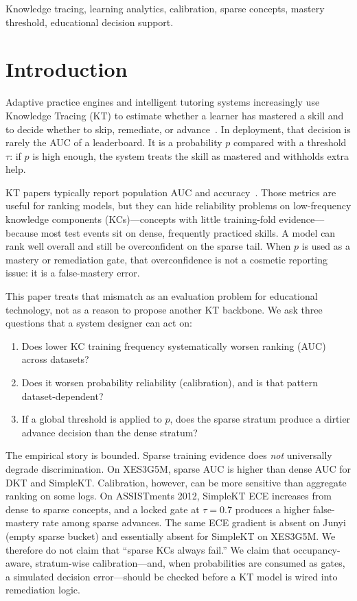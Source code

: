\documentclass[journal,10pt,twocolumn]{IEEEtran}
\begin{document}
\begin{IEEEkeywords}
Knowledge tracing, learning analytics, calibration, sparse concepts, mastery threshold, educational decision support.
\end{IEEEkeywords}

\section{Introduction}

Adaptive practice engines and intelligent tutoring systems increasingly use Knowledge Tracing (KT) to estimate whether a learner has mastered a skill and to decide whether to skip, remediate, or advance~\cite{corbett1994knowledge,piech2015deep,abdelrahman2023knowledge}. In deployment, that decision is rarely the AUC of a leaderboard. It is a probability $p$ compared with a threshold $\tau$: if $p$ is high enough, the system treats the skill as mastered and withholds extra help.

KT papers typically report population AUC and accuracy~\cite{liu2023simplekt,liu2022pykt}. Those metrics are useful for ranking models, but they can hide reliability problems on low-frequency knowledge components (KCs)---concepts with little training-fold evidence---because most test events sit on dense, frequently practiced skills. A model can rank well overall and still be overconfident on the sparse tail. When $p$ is used as a mastery or remediation gate, that overconfidence is not a cosmetic reporting issue: it is a false-mastery error.

This paper treats that mismatch as an evaluation problem for educational technology, not as a reason to propose another KT backbone. We ask three questions that a system designer can act on:

\begin{enumerate}
\item Does lower KC training frequency systematically worsen ranking (AUC) across datasets?
\item Does it worsen probability reliability (calibration), and is that pattern dataset-dependent?
\item If a global threshold is applied to $p$, does the sparse stratum produce a dirtier advance decision than the dense stratum?
\end{enumerate}

The empirical story is bounded. Sparse training evidence does \emph{not} universally degrade discrimination. On XES3G5M, sparse AUC is higher than dense AUC for DKT and SimpleKT. Calibration, however, can be more sensitive than aggregate ranking on some logs. On ASSISTments 2012, SimpleKT ECE increases from dense to sparse concepts, and a locked gate at $\tau=0.7$ produces a higher false-mastery rate among sparse advances. The same ECE gradient is absent on Junyi (empty sparse bucket) and essentially absent for SimpleKT on XES3G5M. We therefore do not claim that ``sparse KCs always fail.'' We claim that occupancy-aware, stratum-wise calibration---and, when probabilities are consumed as gates, a simulated decision error---should be checked before a KT model is wired into remediation logic.
\end{document}
